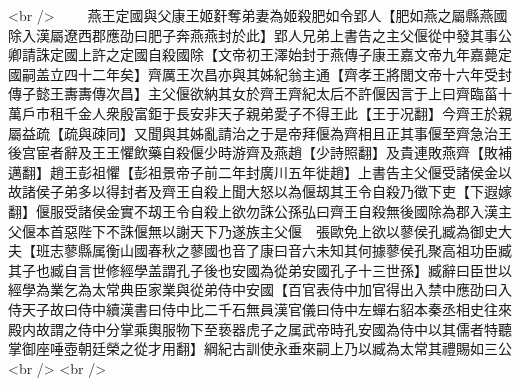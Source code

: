 <br />
　　燕王定國與父康王姬姧奪弟妻為姬殺肥如令郢人【肥如燕之屬縣燕國除入漢屬遼西郡應劭曰肥子奔燕燕封於此】郢人兄弟上書告之主父偃從中發其事公卿請誅定國上許之定國自殺國除【文帝初王澤始封于燕傳子康王嘉文帝九年嘉薨定國嗣盖立四十二年矣】齊厲王次昌亦與其姊紀翁主通【齊孝王將閭文帝十六年受封傳子懿王夀夀傳次昌】主父偃欲納其女於齊王齊紀太后不許偃因言于上曰齊臨菑十萬戶市租千金人衆殷富鉅于長安非天子親弟愛子不得王此【王于况翻】今齊王於親屬益疏【疏與疎同】又聞與其姊亂請治之于是帝拜偃為齊相且正其事偃至齊急治王後宫宦者辭及王王懼飲藥自殺偃少時游齊及燕趙【少詩照翻】及貴連敗燕齊【敗補邁翻】趙王彭祖懼【彭祖景帝子前二年封廣川五年徙趙】上書告主父偃受諸侯金以故諸侯子弟多以得封者及齊王自殺上聞大怒以為偃刼其王令自殺乃徵下吏【下遐嫁翻】偃服受諸侯金實不刼王令自殺上欲勿誅公孫弘曰齊王自殺無後國除為郡入漢主父偃本首惡陛下不誅偃無以謝天下乃遂族主父偃　張歐免上欲以蓼侯孔臧為御史大夫【班志蓼縣属衡山國春秋之蓼國也音了康曰音六未知其何據蓼侯孔聚高祖功臣臧其子也臧自言世修經學盖謂孔子後也安國為從弟安國孔子十三世孫】臧辭曰臣世以經學為業乞為太常典臣家業與從弟侍中安國【百官表侍中加官得出入禁中應劭曰入侍天子故曰侍中續漢書曰侍中比二千石無員漢官儀曰侍中左蟬右貂本秦丞相史往來殿内故謂之侍中分掌乘輿服物下至亵器虎子之属武帝時孔安國為侍中以其儒者特聽掌御座唾壺朝廷榮之從才用翻】綱紀古訓使永垂來嗣上乃以臧為太常其禮賜如三公<br />
<br />
